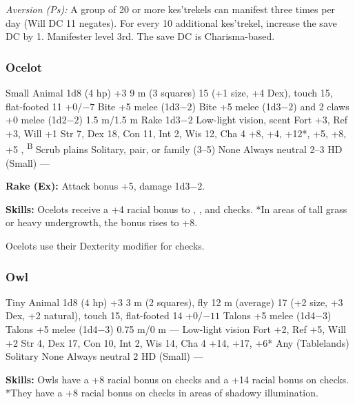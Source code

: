 \textit{Aversion (Ps):} A group of 20 or more kes'trekels can manifest  three times per day (Will DC 11 negates). For every 10 additional kes'trekel, increase the save DC by 1. Manifester level 3rd. The save DC is Charisma-based.

\subsubsection{Ocelot}
\begin{MonsterStats}
{Small Animal}
{1d8 (4 hp)}
{+3}
{9 m (3 squares)}
{15 (+1 size, +4 Dex), touch 15, flat-footed 11}
{+0/$-7$}
{Bite +5 melee (1d3$-2$)}
{Bite +5 melee (1d3$-2$) and 2 claws +0 melee (1d2$-2$)}
{1.5 m/1.5 m}
{Rake 1d3$-2$}
{Low-light vision, scent}
{Fort +3, Ref +3, Will +1}
{Str 7, Dex 18, Con 11, Int 2, Wis 12, Cha 4}
{ +8,  +4,  +12*,  +5,  +8,  +5}
{, \textsuperscript{B}}
{Scrub plains}
{Solitary, pair, or family (3--5)}
{\onehalf}
{None}
{Always neutral}
{2--3 HD (Small)}
{---}
\end{MonsterStats}

\textbf{Rake (Ex):} Attack bonus +5, damage 1d3$-2$.

\textbf{Skills:} Ocelots receive a +4 racial bonus to , , and  checks. *In areas of tall grass or heavy undergrowth, the  bonus rises to +8.

Ocelots use their Dexterity modifier for  checks.

\subsubsection{Owl}
\begin{MonsterStats}
{Tiny Animal}
{1d8 (4 hp)}
{+3}
{3 m (2 squares), fly 12 m (average)}
{17 (+2 size, +3 Dex, +2 natural), touch 15, flat-footed 14}
{+0/$-11$}
{Talons +5 melee (1d4$-3$)}
{Talons +5 melee (1d4$-3$)}
{0.75 m/0 m}
{---}
{Low-light vision}
{Fort +2, Ref +5, Will +2}
{Str 4, Dex 17, Con 10, Int 2, Wis 14, Cha 4}
{ +14,  +17,  +6*}
{}
{Any (Tablelands)}
{Solitary}
{\onequarter}
{None}
{Always neutral}
{2 HD (Small)}
{---}
\end{MonsterStats}

\textbf{Skills:} Owls have a +8 racial bonus on  checks and a +14 racial bonus on  checks. *They have a +8 racial bonus on  checks in areas of shadowy illumination.

